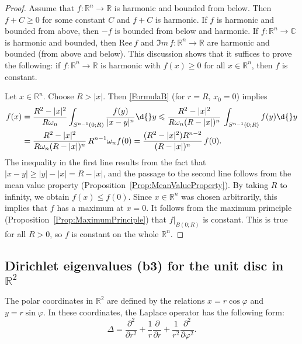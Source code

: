 \documentclass[12pt, oneside, a4paper]{article}
\def\RePart{\Re e \,}
\def\ImPart{\Im m \,}
\theoremstyle{dfn}
\def\Rbb{\ensuremath{\mathbb{R}}}
\renewcommand{\Re}{\text{Re}}
\newcommand{\Com}{\mathbb{C}}
\providecommand{\abs}[1]{\lvert#1\rvert}
\begin{document}
\begin{proof}
Assume that $f \colon \Rbb^n \to \Rbb$ is harmonic and bounded from below. Then $f + C \geqslant 0$ for some constant $C$ and $f + C$ is harmonic. If $f$ is harmonic and bounded from above, then $-f$ is bounded from below and harmonic. If $f \colon \Rbb^n \to \Com$ is harmonic and bounded, then $\RePart f$ and $\ImPart f \colon \Rbb^n \to \Rbb$ are harmonic and bounded (from above and below). This discussion shows that it suffices to prove the following: if $f \colon \Rbb^n \to \Rbb$ is harmonic with $f(x) \geqslant 0$ for all $x \in \Rbb^n$, then $f$ is constant.

Let $x \in \Rbb^n$. Choose $R > \abs{x}$. Then \eqref{FormulaB} (for $r = R$, $x_0 = 0$) implies
\begin{align*}
	f(x)
	&= \frac{R^2 - \abs{x}^2}{R \omega_n} \int_{S^{n-1}(0;R)} \frac{f(y)}{\abs{x-y}^n} \d{}y
	\leqslant \frac{R^2 - \abs{x}^2}{R \omega_n (R - \abs{x})^n} \, \int_{S^{n-1}(0;R)} f(y) \d{}y \\
	&= \frac{R^2 - \abs{x}^2}{R \omega_n (R - \abs{x})^n} \, R^{n-1} \omega_n f(0)
	= \frac{(R^2 - \abs{x}^2) R^{n-2}}{(R - \abs{x})^n} \, f(0).
\end{align*}
The inequality in the first line results from the fact that $\abs{x-y} \geqslant \abs{y} - \abs{x} = R - \abs{x}$, and the passage to the second line follows from the mean value property (Proposition~\ref{Prop:MeanValueProperty}). By taking $R$ to infinity, we obtain $f(x) \leqslant f(0)$. Since $x \in \Rbb^n$ was chosen arbitrarily, this implies that $f$ has a maximum at $x = 0$. It follows from the maximum primciple (Proposition~\ref{Prop:MaximumPrinciple}) that $f|_{B(0;R)}$ is constant. This is true for all $R > 0$, so $f$ is constant on the whole $\Rbb^n$.
\end{proof}

\subsection{Dirichlet eigenvalues (b3) for the unit disc in $\Rbb^2$}

The polar coordinates in $\Rbb^2$ are defined by the relations $x = r \cos \varphi$ and $y = r \sin \varphi$. In these coordinates, the Laplace operator has the following form:
\[
\Delta = \frac{\partial^2}{\partial r^2} + \frac{1}{r} \frac{\partial}{\partial r} + \frac{1}{r^2} \frac{\partial^2}{\partial \varphi^2}.
\]

\end{document}
